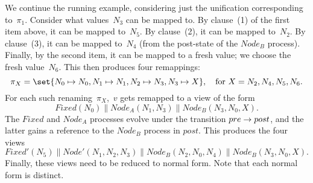 
\begin{example}
We continue the running example, considering just the unification
corresponding to~$\pi_1$.  Consider what values~$N_3$ can be mapped to.  By
clause~(1) of the first item above, it can be mapped to~$N_5$.  By
clause~(2), it can be mapped to~$N_2$.  By clause~(3), it can be mapped
to~$N_4$ (from the post-state of the $Node_B$ process).  Finally, by the
second item, it can be mapped to a fresh value; we choose the fresh
value~$N_6$. 
%
This then produces four remappings:
\[
\pi_X = \set{N_0 \mapsto N_0, N_1 \mapsto N_1, N_2 \mapsto N_3, N_3 \mapsto X},
\quad \mbox{for $X = N_2, N_4, N_5, N_6$}.
\]
For each such renaming~$\pi_X$,\, $v$ gets remapped to a view of the form
\[
Fixed(N_0) \parallel Node_A(N_1, N_3) \parallel Node_B(N_3, N_0, X).
\]
The $Fixed$ and $Node_A$ processes evolve under the transition \( pre
\stackrel{}\rightarrow post \), and the latter gains a reference to the $Node_B$ process in
$post$.  This produces the four views
\[
Fixed'(N_5) \parallel Node'(N_1, N_2, N_3) \parallel 
  Node_B(N_2, N_0, N_4) \parallel Node_B(N_3, N_0, X).
\]
Finally, these views need to be reduced to normal form.  Note that each normal
form is distinct.
\end{example}





